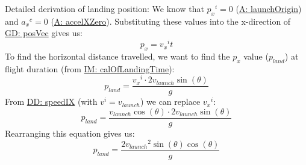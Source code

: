 \documentclass[12pt]{article}
\begin{document}
Detailed derivation of landing position:
We know that ${{p_{x}}^{i}}=0$ (\hyperref[launchOrigin]{A: launchOrigin}) and ${{a_{x}}^{c}}=0$ (\hyperref[accelXZero]{A: accelXZero}). Substituting these values into the x-direction of \hyperref[GD:posVec]{GD: posVec} gives us:
\begin{displaymath}
{p_{x}}={{v_{x}}^{i}} t
\end{displaymath}
To find the horizontal distance travelled, we want to find the ${p_{x}}$ value (${p_{land}}$) at flight duration (from \hyperref[IM:calOfLandingTime]{IM: calOfLandingTime}):
\begin{displaymath}
{p_{land}}=\frac{{{v_{x}}^{i}}\cdot{}2 {v_{launch}} \sin\left(θ\right)}{g}
\end{displaymath}
From \hyperref[DD:speedIX]{DD: speedIX} (with ${v^{i}}={v_{launch}}$) we can replace ${{v_{x}}^{i}}$:
\begin{displaymath}
{p_{land}}=\frac{{v_{launch}} \cos\left(θ\right)\cdot{}2 {v_{launch}} \sin\left(θ\right)}{g}
\end{displaymath}
Rearranging this equation gives us:
\begin{displaymath}
{p_{land}}=\frac{2 {v_{launch}}^{2} \sin\left(θ\right) \cos\left(θ\right)}{g}
\end{displaymath}
\par~
\end{document}
